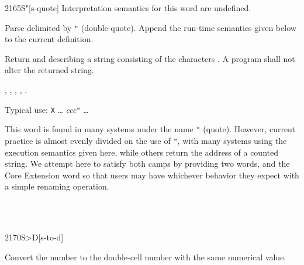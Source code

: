 \begin{worddef}[Sq]{2165}{S"}[s-quote]
\interpret
	Interpretation semantics for this word are undefined.

\compile

	Parse  delimited by \texttt{"} (double-quote).
	Append the run-time semantics given below to the current
	definition.

\runtime

	Return  and  describing a string
	consisting of the characters . A program shall
	not alter the returned string.

\see {},
	,
	,
	,
	.

	\begin{rationale} %
		Typical use:
			\word{:} \texttt{X} {\ldots}
				 \emph{ccc}\texttt{"}
			{\ldots} \word{;}

		This word is found in many systems under the name \texttt{"}
		(quote). However, current practice is almost evenly divided on
		the use of \texttt{"}, with many systems using the execution
		semantics given here, while others return the address of a
		counted string. We attempt here to satisfy both camps by
		providing two words,  and the Core Extension word
		 so that users may have whichever behavior they expect
		with a simple renaming operation.
	\end{rationale}

	\begin{testing} %
		 \\
		 \\
	\end{testing}
\end{worddef}


\begin{worddef}[StoD]{2170}{S>D}[s-to-d]
\item {}

	Convert the number  to the double-cell number 
	with the same numerical value.

	\begin{testing} %
		 \\
		 \\
		 \\
		 \\
		 \\
		 \\
	\end{testing}
\end{worddef}


